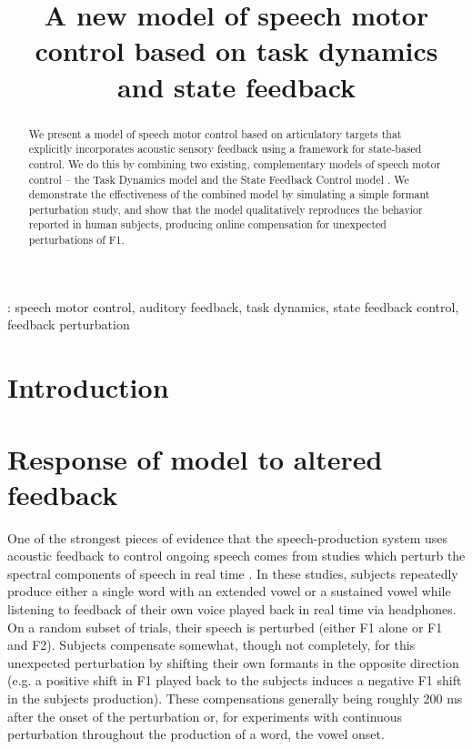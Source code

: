 \documentclass[a4paper]{article}
\title{A new model of speech motor control based on task dynamics and state feedback}
\begin{document}
  \maketitle
  \begin{abstract}

 We present a model of speech motor control based on articulatory targets that explicitly incorporates acoustic sensory feedback using a framework for state-based control. We do this by combining two existing, complementary models of speech motor control -- the Task Dynamics model \cite{SALTZMAN89} and the State Feedback Control model  \cite{HOUDE12}. We demonstrate the effectiveness of the combined model by simulating a simple formant perturbation study, and show that the model qualitatively reproduces the behavior reported in human subjects, producing online compensation for unexpected perturbations of F1.
 
  \let\thefootnote\relax{} 
  \end{abstract}
  : speech motor control, auditory feedback, task dynamics, state feedback control, feedback perturbation


  \section{Introduction}
 
  \section{Response of model to altered feedback}
  One of the strongest pieces of evidence that the speech-production system uses acoustic feedback to control ongoing speech comes from studies which perturb the spectral components of speech in real time \cite{PURCEL2006, TOURVILLE2008, NIZIOLEK2013}. In these studies, subjects repeatedly produce either a single word with an extended vowel or a sustained vowel while listening to feedback of their own voice played back in real time via headphones. On a random subset of trials, their speech is perturbed (either F1 alone or F1 and F2). Subjects compensate somewhat, though not completely, for this unexpected perturbation by shifting their own formants in the opposite direction (e.g. a positive shift in F1 played back to the subjects induces a negative F1 shift in the subjects production). These compensations generally being roughly 200 ms after the onset of the perturbation or, for experiments with continuous perturbation throughout the production of a word, the vowel onset.  
  
\end{document}
